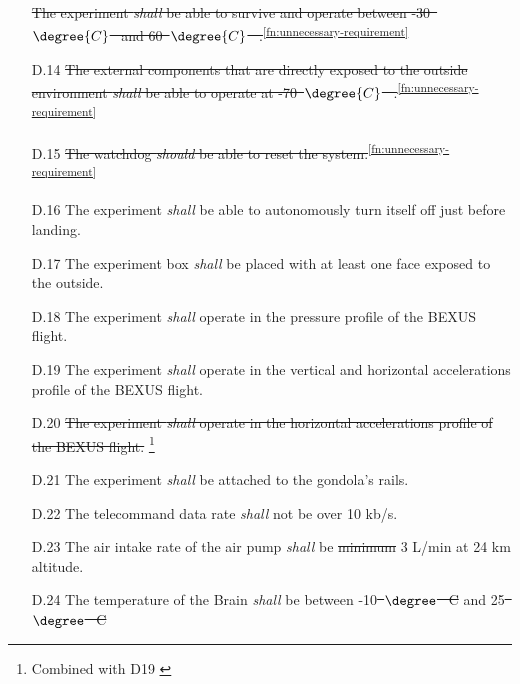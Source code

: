 \documentclass[a4paper,12pt,oneside]{article} %
\providecommand{\DIFaddtex}[1]{{\protect\color{blue}\uwave{#1}}} %
\providecommand{\DIFdeltex}[1]{{\protect\color{red}\sout{#1}}}                      %
\providecommand{\DIFaddbegin}{} %
\providecommand{\DIFaddend}{} %
\providecommand{\DIFdelbegin}{} %
\providecommand{\DIFdelend}{} %
\providecommand{\DIFadd}[1]{\texorpdfstring{\DIFaddtex{#1}}{#1}} %
\providecommand{\DIFdel}[1]{\texorpdfstring{\DIFdeltex{#1}}{}} %
\newcommand{\DIFscaledelfig}{0.5}
\newlength{\DIFdelgraphicswidth} %
\newlength{\DIFdelgraphicsheight} %
\newcommand{\DIFaddincludegraphics}[2][]{{\color{blue}\fbox{\DIFOincludegraphics[#1]{#2}}}} %
\newcommand{\DIFdelincludegraphics}[2][]{%
\sbox{\DIFdelgraphicsbox}{\DIFOincludegraphics[#1]{#2}}%
\settoboxwidth{\DIFdelgraphicswidth}{\DIFdelgraphicsbox} %
\settoboxtotalheight{\DIFdelgraphicsheight}{\DIFdelgraphicsbox} %
\scalebox{\DIFscaledelfig}{%
\parbox[b]{\DIFdelgraphicswidth}{\usebox{\DIFdelgraphicsbox}\\[-\baselineskip] \rule{\DIFdelgraphicswidth}{0em}}\llap{\resizebox{\DIFdelgraphicswidth}{\DIFdelgraphicsheight}{%
\setlength{\unitlength}{\DIFdelgraphicswidth}%
\begin{picture}(1,1)%
\thicklines\linethickness{2pt} %
{\color[rgb]{1,0,0}\put(0,0){\framebox(1,1){}}}%
{\color[rgb]{1,0,0}\put(0,0){\line( 1,1){1}}}%
{\color[rgb]{1,0,0}\put(0,1){\line(1,-1){1}}}%
\end{picture}%
}\hspace*{3pt}}} %
} %
\DeclareRobustCommand{\DIFaddbegin}{\DIFOaddbegin \let\includegraphics\DIFaddincludegraphics} %
\DeclareRobustCommand{\DIFaddend}{\DIFOaddend \let\includegraphics\DIFOincludegraphics} %
\DeclareRobustCommand{\DIFdelbegin}{\DIFOdelbegin \let\includegraphics\DIFdelincludegraphics} %
\DeclareRobustCommand{\DIFdelend}{\DIFOaddend \let\includegraphics\DIFOincludegraphics} %
\begin{document}
\begin{appendices}
\begin{enumerate}
\DIFdelend \DIFaddbegin \st{The experiment \textit{shall} be able to survive and operate between -30\mbox{%
$\degree{C}$
}%
and 60\mbox{%
$\degree{C}$
}%
.}\DIFaddend \textsuperscript{\ref{fn:unnecessary-requirement}}
    \item[D.14] \DIFdelbegin %
\DIFdelend \DIFaddbegin \st{The external components that are directly exposed to the outside environment \textit{shall} be able to operate at -70\mbox{%
$\degree{C}$
}%
.}\DIFaddend \textsuperscript{\ref{fn:unnecessary-requirement}}
    \item[D.15] \st{The watchdog \textit{should} be able to reset the system.}\textsuperscript{\ref{fn:unnecessary-requirement}}
    \item[D.16] The experiment \textit{shall} be able to autonomously turn itself off just before landing.
    \item[D.17] The experiment box \textit{shall} be placed with at least one face exposed to the outside.
    \item[D.18] The experiment \textit{shall} operate in the pressure profile of the BEXUS flight\cite{BexusManual}.
    \item[D.19] The experiment \textit{shall} operate in the vertical and horizontal accelerations profile of the BEXUS flight\cite{BexusManual}.
    \item[D.20] \st{The experiment \textit{shall} operate in the
    horizontal accelerations profile of the BEXUS flight.} \cite{BexusManual} \footnote{Combined with D19 \label{fn:combi-d19}}
    \item[D.21] The experiment \textit{shall} be attached to the gondola's rails.
    \item[D.22] The telecommand data rate \textit{shall} not be over 10 kb/s.
    \item[D.23] The air intake rate of the air pump \textit{shall} be \DIFdelbegin \DIFdel{minimum }\DIFdelend \DIFaddbegin \DIFadd{equivalent to a minimum of }\DIFaddend 3 L/min at 24 km altitude.
    \item[D.24] The temperature of the Brain \textit{shall} be between -10\DIFdelbegin \DIFdel{\mbox{%
$\degree$
}%
C }\DIFdelend \DIFaddbegin \DIFadd{\mbox{%
$\degree{C}$
}%
}\DIFaddend and 25\DIFdelbegin \DIFdel{\mbox{%
$\degree$
}%
C}\DIFdelend \DIFaddbegin \DIFadd{\mbox{%
}}
\end{enumerate}
\end{appendices}
\end{document}
